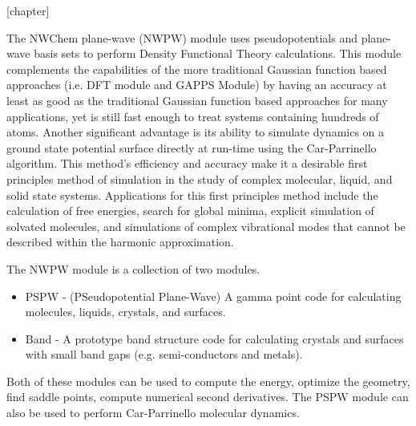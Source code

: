 \label{sec:pspw}

[chapter]
\def\thealgcounter{\thechapter.\arabic{algcounter}}
\newenvironment{algorithm}[1]
               { \refstepcounter{algcounter}
                \begin{center}
                  {\bf Algorithm} \thealgcounter: #1
                \end{center}
               \begin{center}\begin{enumerate} \begin{em}}
               {\end{em}\end{enumerate}\end{center}}
 

The NWChem plane-wave (NWPW) module uses pseudopotentials and
plane-wave basis sets to perform Density Functional Theory
calculations.  This module complements the capabilities of the more
traditional Gaussian function based approaches (i.e. DFT module and
GAPPS Module) by having an accuracy at least as good as the
traditional Gaussian function based approaches for many applications,
yet is still fast enough to treat systems containing hundreds of
atoms.  Another significant advantage is its ability to simulate
dynamics on a ground state potential surface directly at run-time
using the Car-Parrinello algorithm.  This method's efficiency and
accuracy make it a desirable first principles method of simulation in
the study of complex molecular, liquid, and solid state systems.
Applications for this first principles method include the calculation
of free energies, search for global minima, explicit simulation of
solvated molecules, and simulations of complex vibrational modes that
cannot be described within the harmonic  approximation.

The NWPW module is a collection of two modules.
\begin{itemize}
   \item PSPW - (PSeudopotential Plane-Wave) A gamma point code for
     calculating molecules, liquids, crystals, and  surfaces.  
   \item Band - A prototype band structure code for calculating
     crystals and surfaces with small band gaps (e.g. semi-conductors
     and metals).
\end{itemize}
Both of these modules can be used to compute the energy, optimize the
geometry, find saddle points, compute numerical second derivatives.
The PSPW module can also be used to perform Car-Parrinello molecular  dynamics.

